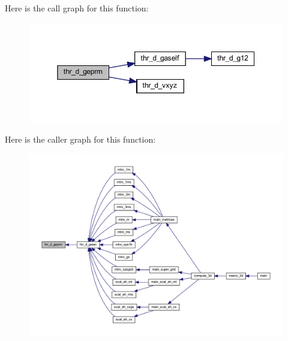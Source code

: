 Here is the call graph for this function\+:
\nopagebreak
\begin{figure}[H]
\begin{center}
\leavevmode
\includegraphics[width=350pt]{Marco_8f90_a9a9e9c370268b4527247c902f6879e7c_cgraph}
\end{center}
\end{figure}
Here is the caller graph for this function\+:
\nopagebreak
\begin{figure}[H]
\begin{center}
\leavevmode
\includegraphics[width=350pt]{Marco_8f90_a9a9e9c370268b4527247c902f6879e7c_icgraph}
\end{center}
\end{figure}
\mbox{\label{Marco_8f90_a10048a9736ad8beefbadc2a0bc43f675}} 
